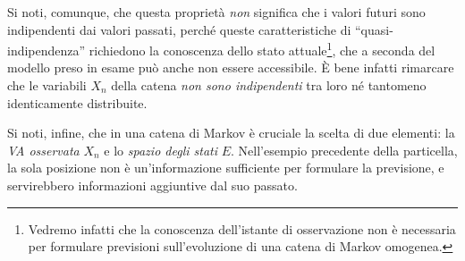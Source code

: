 Si noti, comunque, che questa proprietà \emph{non} significa che i valori futuri sono indipendenti dai valori passati, perché queste caratteristiche di ``quasi-indipendenza'' richiedono la conoscenza dello stato attuale\footnote{Vedremo infatti che la conoscenza dell'istante di osservazione non è necessaria per formulare previsioni sull'evoluzione di una catena di Markov omogenea.}, che a seconda del modello preso in esame può anche non essere accessibile.
È bene infatti rimarcare che le variabili $X_n$ della catena \emph{non sono indipendenti} tra loro né tantomeno identicamente distribuite.

Si noti, infine, che in una catena di Markov è cruciale la scelta di due elementi: la \emph{VA osservata} $X_n$ e lo \emph{spazio degli stati} $E$.
Nell'esempio precedente della particella, la sola posizione non è un'informazione sufficiente per formulare la previsione, e servirebbero informazioni aggiuntive dal suo passato.

